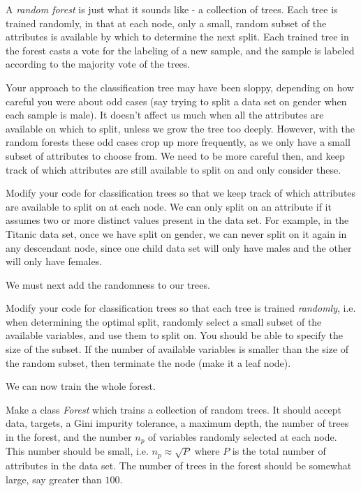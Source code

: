

A \emph{random forest} is just what it sounds like - a collection of trees. Each tree is trained randomly, in that at each node, only a small, random subset of the attributes is available by which to determine the next split. Each trained tree in the forest casts a vote for the labeling of a new sample, and the sample is labeled according to the majority vote of the trees.

Your approach to the classification tree may have been sloppy, depending on how careful you were about odd cases (say trying to split a data set on gender when each sample is male). It doesn't affect us much when all the attributes are available on which to split, unless we grow the tree too deeply. However, with the random forests these odd cases crop up more frequently, as we only have a small subset of attributes to choose from. We need to be more careful then, and keep track of which attributes are still available to split on and only consider these.

\begin{problem}
Modify your code for classification trees so that we keep track of which attributes are available to split on at each node. We can only split on an attribute if it assumes two or more distinct values present in the data set. For example, in the Titanic data set, once we have split on gender, we can never split on it again in any descendant node, since one child data set will only have males and the other will only have females.
\end{problem}

We must next add the randomness to our trees.

\begin{problem}
Modify your code for classification trees so that each tree is trained \emph{randomly}, i.e. when determining the optimal split, randomly select a small subset of the available variables, and use them to split on. You should be able to specify the size of the subset. If the number of available variables is smaller than the size of the random subset, then terminate the node (make it a leaf node).
\end{problem}

We can now train the whole forest.

\begin{problem}
Make a class \emph{Forest} which trains a collection of random trees. It should accept data, targets, a Gini impurity tolerance, a maximum depth, the number of trees in the forest, and the number $n_{p}$ of variables randomly selected at each node. This number should be small, i.e. $n_{p} \approx \sqrt{P}$ where $P$ is the total number of attributes in the data set. The number of trees in the forest should be somewhat large, say greater than $100$.
\end{problem}

